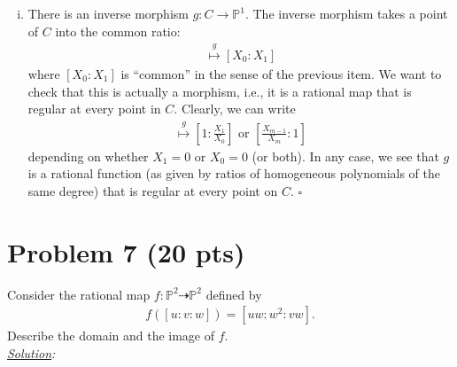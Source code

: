 \documentclass[12pt]{article}
\newcommand{\f}[2]{\frac{#1}{#2}}
\begin{document}
\begin{enumerate}[(i)]
	
	\item There is an inverse morphism $g: C\to \mathbb{P}^1$. The inverse morphism takes a point of $C$ into the common ratio:
	\begin{align*}
	[X_0 : \dots : X_m] \stackrel{g}{\mapsto} [X_0 : X_1]
	\end{align*}
	where $[X_0 : X_1]$ is ``common'' in the sense of the previous item. We want to check that this is actually a morphism, i.e., it is a rational map that is regular at every point in $C$. Clearly, we can write
	\begin{align*}
	[X_0 : \dots : X_m] \stackrel{g}{\mapsto} \left[1 : \f{X_1}{X_0}\right] \mbox{ or } \left[\f{X_{m-1}}{X_m} : 1\right]
	\end{align*}
	depending on whether $X_1 =0$ or $X_0 = 0$ (or both). In any case, we see that $g$ is a rational function (as given by ratios of homogeneous polynomials of the same degree) that is regular at every point on $C$. \hfill $\square$ 
	
	
	
	
\end{enumerate}


\newpage


\section*{Problem 7 \small{(20 pts)}}
Consider the rational map $f : \mathbb{P}^2 \dashrightarrow \mathbb{P}^2$ defined by
\begin{align*}
f([u:v:w]) = [uw : w^2 : vw].
\end{align*}
Describe the domain and the image of $f$. \\


\noindent \textit{\underline{Solution}:} 



\newpage
\end{document}
